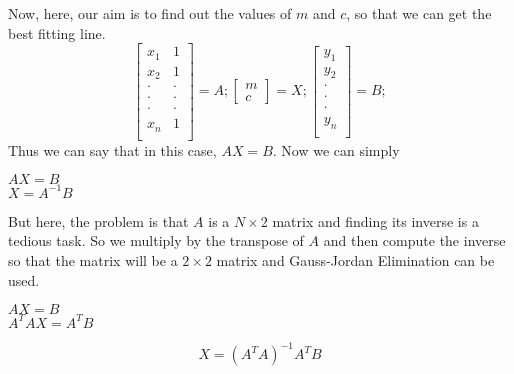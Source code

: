 \documentclass[12pt]{article}
\begin{document}
    Now, here, our aim is to find out the values of $m$ and $c$, so that we can get the best fitting line.
        \begin{equation*}
            \begin{bmatrix}
                x_1  &  1\\
                x_2  &  1\\
                \cdot  &  \cdot\\
                \cdot  &  \cdot\\
                \cdot  &  \cdot\\
                x_n  &  1\\
            \end{bmatrix}
            =A  ;  
            \begin{bmatrix}
                m\\
                c
            \end{bmatrix}
            = X ;
            \begin{bmatrix}
                y_1\\
                y_2\\
                \cdot\\
                \cdot\\
                \cdot\\
                y_n\\
            \end{bmatrix}
            = B;
            \label{equ:matrix}
        \end{equation*}
        Thus we can say that in this case, $AX=B$.
        Now we can simply 
        \begin{center}
            $AX=B$\\
            $X=A^{-1}B$
        \end{center}
        But here, the problem is that $A$ is a $N \times 2$ matrix and finding its inverse is a tedious task. So we multiply by the transpose of $A$ and then compute the inverse so that the matrix will be a $2 \times 2$ matrix and Gauss-Jordan Elimination can be used.
        \begin{center}
            $AX=B$\\
            $A^TAX=A^TB$
        \end{center}
        \begin{equation}
            X = (A^TA)^{-1}A^TB
        \end{equation}
            
     
        
\end{document}
